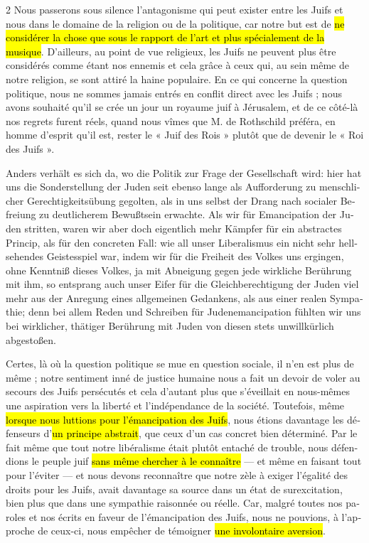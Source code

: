 \documentclass[a4paper,12pt]{article}
\newcommand\chunks[2]{%
\begin{leftcolumn*}\begin{otherlanguage}{german}%
{#1}%
\end{otherlanguage}\end{leftcolumn*}%
\begin{rightcolumn}\begin{otherlanguage}{french}%
{#2}%
\end{otherlanguage}\end{rightcolumn}%
}
\begin{document}
\begin{paracol}{2}
         {Nous passerons sous silence l’antagonisme qui peut exister entre les Juifs et nous dans le domaine de la religion ou de la politique, car notre but est de \hl{ne considérer la chose que sous le rapport de l’art et plus spécialement de la musique}. D’ailleurs, au point de vue religieux, les Juifs ne peuvent plus être considérés comme étant nos ennemis et cela grâce à ceux qui, au sein même de notre religion, se sont attiré la haine populaire. En ce qui concerne la question politique, nous ne sommes jamais entrés en conflit direct avec les Juifs ; nous avons souhaité qu’il se crée un jour un royaume juif à Jérusalem, et de ce côté-là nos regrets furent réels, quand nous vîmes que M. de Rothschild préféra, en homme d’esprit qu’il est, rester le « Juif des Rois » plutôt que de devenir le « Roi des Juifs ».}
  \chunks{Anders verhält es sich da, wo die Politik zur Frage der Gesellschaft wird: hier hat uns die Sonderstellung der Juden seit ebenso lange als Aufforderung zu menschlicher Gerechtigkeitsübung gegolten, als in uns selbst der Drang nach socialer Befreiung zu deutlicherem Bewußtsein erwachte. Als wir für Emancipation der Juden stritten, waren wir aber doch eigentlich mehr Kämpfer für ein abstractes Princip, als für den concreten Fall: wie all unser Liberalismus ein nicht sehr hellsehendes Geistesspiel war, indem wir für die Freiheit des Volkes uns ergingen, ohne Kenntniß dieses Volkes, ja mit Abneigung gegen jede wirkliche Berührung mit ihm, so entsprang auch unser Eifer für die Gleichberechtigung der Juden viel mehr aus der Anregung eines allgemeinen Gedankens, als aus einer realen Sympathie; denn bei allem Reden und Schreiben für Judenemancipation fühlten wir uns bei wirklicher, thätiger Berührung mit Juden von diesen stets unwillkürlich abgestoßen.}
         {Certes, là où la question politique se mue en question sociale, il n’en est plus de même ; notre sentiment inné de justice humaine nous a fait un devoir de voler au secours des Juifs persécutés et cela d’autant plus que s’éveillait en nous-mêmes une aspiration vers la liberté et l’indépendance de la société. Toutefois, même \hl{lorsque nous luttions pour l’émancipation des Juifs}, nous étions davantage les défenseurs d’\hl{un principe abstrait}, que ceux d’un cas concret bien déterminé. Par le fait même que tout notre libéralisme était plutôt entaché de trouble, nous défendions le peuple juif \hl{sans même chercher à le connaître} --- et même en faisant tout pour l’éviter --- et nous devons reconnaître que notre zèle à exiger l’égalité des droits pour les Juifs, avait davantage sa source dans un état de surexcitation, bien plus que dans une sympathie raisonnée ou réelle. Car, malgré toutes nos paroles et nos écrits en faveur de l’émancipation des Juifs, nous ne pouvions, à l’approche de ceux-ci, nous empêcher de témoigner \hl{une involontaire aversion}.}

\end{paracol}
\end{document}
